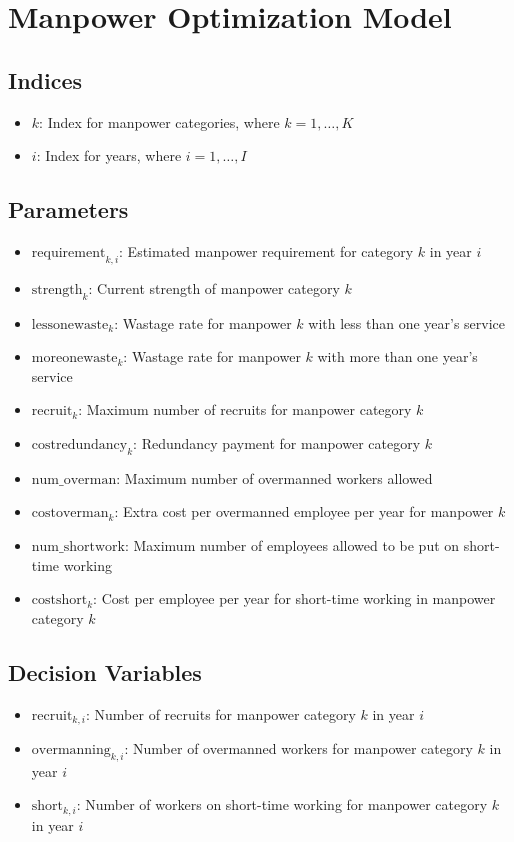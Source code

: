\documentclass{article}
\begin{document}
\section*{Manpower Optimization Model}

\subsection*{Indices}
\begin{itemize}
    \item \( k \): Index for manpower categories, where \( k = 1, \ldots, K \)
    \item \( i \): Index for years, where \( i = 1, \ldots, I \)
\end{itemize}

\subsection*{Parameters}
\begin{itemize}
    \item \( \text{requirement}_{k, i} \): Estimated manpower requirement for category \( k \) in year \( i \)
    \item \( \text{strength}_{k} \): Current strength of manpower category \( k \)
    \item \( \text{lessonewaste}_{k} \): Wastage rate for manpower \( k \) with less than one year's service
    \item \( \text{moreonewaste}_{k} \): Wastage rate for manpower \( k \) with more than one year's service
    \item \( \text{recruit}_{k} \): Maximum number of recruits for manpower category \( k \)
    \item \( \text{costredundancy}_{k} \): Redundancy payment for manpower category \( k \)
    \item \( \text{num\_overman} \): Maximum number of overmanned workers allowed
    \item \( \text{costoverman}_{k} \): Extra cost per overmanned employee per year for manpower \( k \)
    \item \( \text{num\_shortwork} \): Maximum number of employees allowed to be put on short-time working
    \item \( \text{costshort}_{k} \): Cost per employee per year for short-time working in manpower category \( k \)
\end{itemize}

\subsection*{Decision Variables}
\begin{itemize}
    \item \( \text{recruit}_{k, i} \): Number of recruits for manpower category \( k \) in year \( i \)
    \item \( \text{overmanning}_{k, i} \): Number of overmanned workers for manpower category \( k \) in year \( i \)
    \item \( \text{short}_{k, i} \): Number of workers on short-time working for manpower category \( k \) in year \( i \)
\end{itemize}
\end{document}
